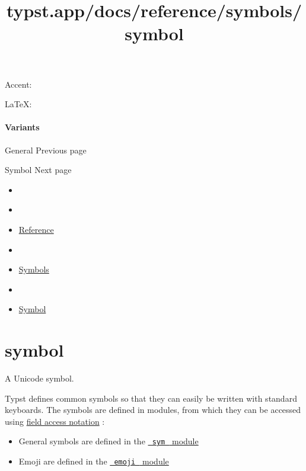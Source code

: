 Accent:


LaTeX: \texttt{\ }

\paragraph{Variants}\label{variants}

{ }

\href{/docs/reference/symbols/sym/}{\pandocbounded{}}

{ General } { Previous page }

\href{/docs/reference/symbols/symbol/}{\pandocbounded{}}

{ Symbol } { Next page }


\title{typst.app/docs/reference/symbols/symbol}

\begin{itemize}
\tightlist
\item
  \href{/docs}{}
\item
  
\item
  \href{/docs/reference/}{Reference}
\item
  
\item
  \href{/docs/reference/symbols/}{Symbols}
\item
  
\item
  \href{/docs/reference/symbols/symbol/}{Symbol}
\end{itemize}

\section{\texorpdfstring{{ symbol }}{ symbol }}\label{summary}

A Unicode symbol.

Typst defines common symbols so that they can easily be written with
standard keyboards. The symbols are defined in modules, from which they
can be accessed using \href{/docs/reference/scripting/\#fields}{field
access notation} :

\begin{itemize}
\tightlist
\item
  General symbols are defined in the
  \href{/docs/reference/symbols/sym/}{\texttt{\ sym\ } module}
\item
  Emoji are defined in the
  \href{/docs/reference/symbols/emoji/}{\texttt{\ emoji\ } module}
\end{itemize}

